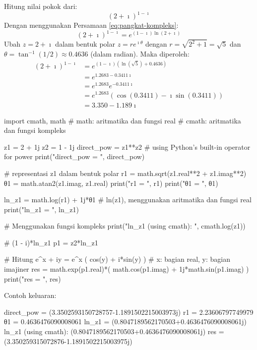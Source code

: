 \begin{contoh}
Hitung nilai pokok dari:
\begin{equation*}
(2 + \imath)^{1 - \imath}
\end{equation*}
Dengan menggunakan Persamaan \eqref{eq:pangkat-kompleks}:
\begin{equation}
(2 + \imath)^{1 - \imath} = e^{(1-\imath) \ln(2 + \imath)}
\end{equation}
Ubah $z = 2 + \imath$ dalam bentuk polar $z = r e^{\imath \theta}$
dengan $r = \sqrt{2^2 + 1} = \sqrt{5}$ dan
$\theta = \tan^{-1}(1/2) \approx 0.4636$ (dalam radian).
Maka diperoleh:
\begin{align*}
(2 + \imath)^{1 - \imath} & = e^{ (1-\imath)( \ln(\sqrt{5}) + 0.4636) } \\
& = e^{1.2683 - 0.3411\imath} \\
& = e^{1.2683} e^{-0.3411\imath} \\
& = e^{1.2683} \left( \cos(0.3411) - \imath \sin(0.3411) \right) \\
& = 3.350 - 1.189\imath
\end{align*}
\end{contoh}

\begin{pythoncode}
import cmath, math
# math: aritmatika dan fungsi real
# cmath: aritmatika dan fungsi kompleks

z1 = 2 + 1j
z2 = 1 - 1j
direct_pow = z1**z2 # using Python's built-in operator for power
print("direct_pow = ", direct_pow)

# representasi z1 dalam bentuk polar
r1 = math.sqrt(z1.real**2 + z1.imag**2)
θ1 = math.atan2(z1.imag, z1.real)
print("r1 = ", r1)
print("θ1 = ", θ1)

ln_z1 = math.log(r1) + 1j*θ1 # ln(z1), menggunakan aritmatika dan fungsi real
print("ln_z1 = ", ln_z1)

# Menggunakan fungsi kompleks
print("ln_z1 (using cmath): ", cmath.log(z1))

# (1 - i)*ln_z1
p1 = z2*ln_z1

# Hitung e^{x + iy} = e^x ( cos(y) + i*sin(y) )
# x: bagian real, y: bagian imajiner
res = math.exp(p1.real)*( math.cos(p1.imag) + 1j*math.sin(p1.imag) )
print("res = ", res)
\end{pythoncode}

Contoh keluaran:
\begin{textcode}
direct_pow =  (3.3502593150728757-1.1891502215003973j)
r1 =  2.23606797749979
θ1 =  0.4636476090008061
ln_z1 =  (0.8047189562170503+0.4636476090008061j)
ln_z1 (using cmath):  (0.8047189562170503+0.4636476090008061j)
res =  (3.350259315072876-1.1891502215003975j)
\end{textcode}




